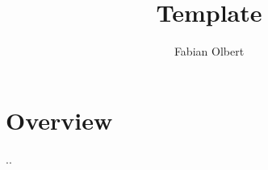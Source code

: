\documentclass[8pt]{extarticle}
\title{Template}
\author{Fabian Olbert}                    %
\begin{document}
\setlength{\columnseprule}{0.2pt}

\begin{multicols*}{4}


\noindent
{\Large\scshape\color{catBlue}\inserttitle} %

\section{Overview}

..


\end{multicols*}
\end{document}
